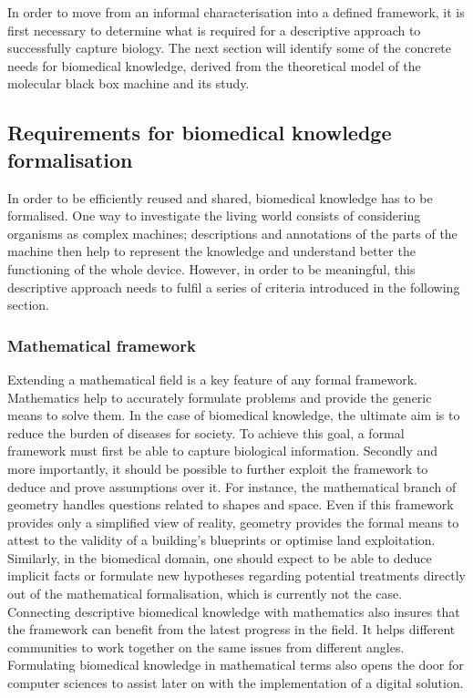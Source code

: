 In order to move from an informal characterisation into a defined framework, it is first necessary to determine what is required for a descriptive approach to successfully capture biology. The next section will identify some of the concrete needs for biomedical knowledge, derived from the theoretical model of the molecular black box machine and its study.

\subsection{Requirements for biomedical knowledge formalisation}

In order to be efficiently reused and shared, biomedical knowledge has to be formalised. One way to investigate the living world consists of considering organisms as complex machines; descriptions and annotations of the parts of the machine then help to represent the knowledge and understand better the functioning of the whole device. However, in order to be meaningful, this descriptive approach needs to fulfil a series of criteria introduced in the following section.

\subsubsection{Mathematical framework}
\label{reqmath}

Extending a mathematical field is a key feature of any formal framework. Mathematics help to accurately formulate problems and provide the generic means to solve them. In the case of biomedical knowledge, the ultimate aim is to reduce the burden of diseases for society. To achieve this goal, a formal framework must first be able to capture biological information. Secondly and more importantly, it should be possible to further exploit the framework to deduce and prove assumptions over it. For instance, the mathematical branch of geometry handles questions related to shapes and space. Even if this framework provides only a simplified view of reality, geometry provides the formal means to attest to the validity of a building's blueprints or optimise land exploitation. Similarly, in the biomedical domain, one should expect to be able to deduce implicit facts or formulate new hypotheses regarding potential treatments directly out of the mathematical formalisation, which is currently not the case. Connecting descriptive biomedical knowledge with mathematics also insures that the framework can benefit from the latest progress in the field. It helps different communities to work together on the same issues from different angles. Formulating biomedical knowledge in mathematical terms also opens the door for computer sciences to assist later on with the implementation of a digital solution.

